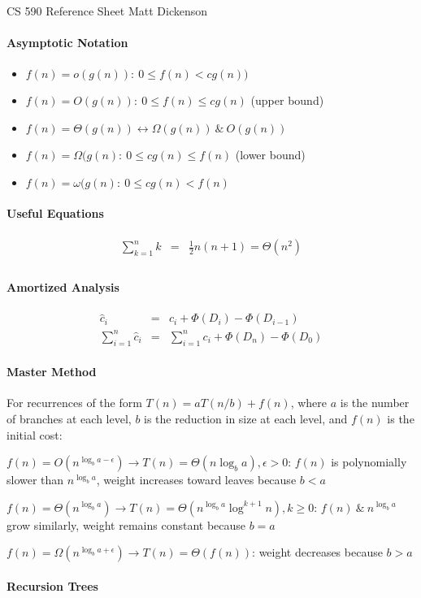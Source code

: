 \documentclass[10pt,letterpaper]{article}
\begin{document}
\large CS 590 Reference Sheet \hfill Matt Dickenson
\headsep 10pt

\paragraph{Asymptotic Notation}
\begin{itemize}
\item $f(n)=o(g(n)):~ 0 \leq f(n) < cg(n))$
\item $f(n)=O(g(n)):~0 \leq f(n) \leq cg(n)$ (upper bound) 
\item $f(n)=\Theta(g(n)) \leftrightarrow \Omega(g(n))~\&~O(g(n)) $
\item $f(n)=\Omega(g(n):~0 \leq cg(n) \leq f(n)$ (lower bound) 
\item $f(n)=\omega(g(n):~0 \leq cg(n) < f(n)$ 
\end{itemize}

\paragraph{Useful Equations}
\begin{eqnarray*}
\sum_{k=1}^n k &=& \frac{1}{2}n(n+1) = \Theta(n^2) \\
\end{eqnarray*}

\paragraph{Amortized Analysis}
\begin{eqnarray*}
\hat{c}_i &=& c_i + \Phi(D_i) - \Phi(D_{i-1}) \\
\sum_{i=1}^n \hat{c}_i &=& \sum_{i=1}^n c_i + \Phi(D_n)-\Phi(D_0)
\end{eqnarray*}

\paragraph{Master Method}
For recurrences of the form $T(n)=a T(n/b) + f(n)$, where $a$ is the number of branches at each level, $b$ is the reduction in size at each level, and $f(n)$ is the initial cost:

\begin{list}{\textbf{Case} :~}{}
\item $f(n) = O(n^{\log_b a - \epsilon}) \rightarrow T(n)=\Theta(n \log_b a), \epsilon>0$: $f(n)$ is polynomially slower than $n^{\log_b a}$, weight increases toward leaves because $b<a$
\item $f(n)=\Theta(n^{\log_b a}) \rightarrow T(n)=\Theta(n^{\log_b a} \log^{k+1} n), k\geq 0$: $f(n)~\&~n^{\log_b a}$ grow similarly, weight remains constant because $b=a$
\item $f(n)=\Omega(n^{\log_b a + \epsilon}) \rightarrow T(n)=\Theta(f(n))$: weight decreases because $b>a$
\end{list}

\pagebreak
\paragraph{Recursion Trees}
\end{document}
